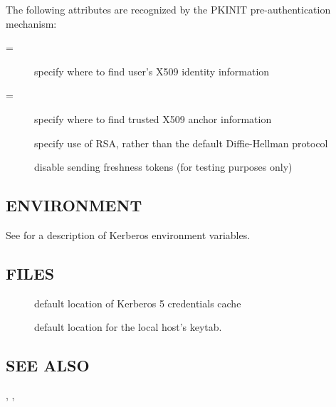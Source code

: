 \documentclass[letterpaper,10pt,english]{sphinxmanual}
\begin{document}
\begin{description}
The following attributes are recognized by the PKINIT
pre-authentication mechanism:
\begin{description}
\item[{=}] \leavevmode
specify where to find user’s X509 identity information

\item[{=}] \leavevmode
specify where to find trusted X509 anchor information

\item[{\sphinxstylestrong{flag\_RSA\_PROTOCOL}{[}\sphinxstylestrong{=yes}{]}}] \leavevmode
specify use of RSA, rather than the default Diffie-Hellman
protocol

\item[{\sphinxstylestrong{disable\_freshness}{[}\sphinxstylestrong{=yes}{]}}] \leavevmode
disable sending freshness tokens (for testing purposes only)

\end{description}

\end{description}


\subsection{ENVIRONMENT}
\label{\detokenize{user/user_commands/kinit:environment}}
See {\hyperref[\detokenize{user/user_config/kerberos:kerberos-7}]{}} for a description of Kerberos environment
variables.


\subsection{FILES}
\label{\detokenize{user/user_commands/kinit:files}}\begin{description}
\item[{}] \leavevmode
default location of Kerberos 5 credentials cache

\item[{}] \leavevmode
default location for the local host’s keytab.

\end{description}


\subsection{SEE ALSO}
\label{\detokenize{user/user_commands/kinit:see-also}}
{\hyperref[\detokenize{user/user_commands/klist:klist-1}]{}}, {\hyperref[\detokenize{user/user_commands/kdestroy:kdestroy-1}]{}}, {\hyperref[\detokenize{user/user_config/kerberos:kerberos-7}]{}}
\end{document}
